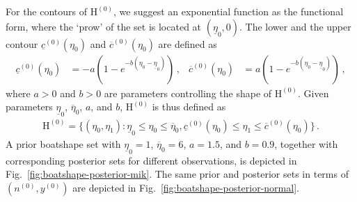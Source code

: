 \documentclass[runningheads,a4paper]{llncs}
\newcommand{\uz}{^{(0)}} %
\newcommand{\ul}[1]{\underline{#1}}
\newcommand{\ol}[1]{\overline{#1}}
\def\yz{y\uz}
\def\nz{n\uz}
\def\EZ{\mathrm{H}\uz}
\def\ezl{\ul{\eta}_0}
\def\ezu{\ol{\eta}_0}
\def\czl{\ul{c}\uz}
\def\czu{\ol{c}\uz}
\begin{document}
For the contours of $\EZ$, we suggest an exponential function as the functional form,
where the `prow' of the set is located at $(\ezl, 0)$.
The lower and the upper contour $\czl(\eta_0)$ and $\czu(\eta_0)$ are defined as
\begin{align}
\czl(\eta_0) &= -a \left( 1 - e^{-b(\eta_0 - \ezl)} \right)\,, &
\czu(\eta_0) &=  a \left( 1 - e^{-b(\eta_0 - \ezl)} \right)\,, 
\label{eq:basiccontours}
\end{align}
where $a > 0$ and $b > 0$ are parameters controlling the shape of $\EZ$.
Given parameters $\ezl$, $\ezu$, $a$, and $b$, $\EZ$ is thus defined as
\begin{align}
\label{eq:basicset}
\EZ =
\{(\eta_0,\eta_1) \colon \ezl \le \eta_0 \le \ezu, \czl(\eta_0) \le  \eta_1 \le \czu(\eta_0) \}\,.
\end{align}
A prior boatshape set with $\ezl=1$, $\ezu=6$, $a=1.5$, and $b=0.9$,
together with corresponding posterior sets for different observations,
is depicted in Fig.~\ref{fig:boatshape-posterior-mik}.
The same prior and posterior sets in terms of $(\nz, \yz)$ are depicted in Fig.~\ref{fig:boatshape-posterior-normal}.
\end{document}
